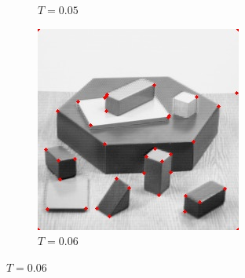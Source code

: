 \documentclass[10pt,a4paper,twoside]{article}
\newcommand{\sweepsize}{0.26}
\begin{document}
\begin{figure}[h]
\begin{subfigure}{\sweepsize\textwidth}
    \caption{$T=0.05$}
    \end{subfigure}
    \begin{subfigure}{\sweepsize\textwidth}
    \includegraphics[width=0.9\linewidth, height=0.9\linewidth]{sweep_blocks/blocks_10_006_1e-05.jpg} 
    \caption{$T=0.06$}
    \end{subfigure}
    

\end{figure}
\end{document}
